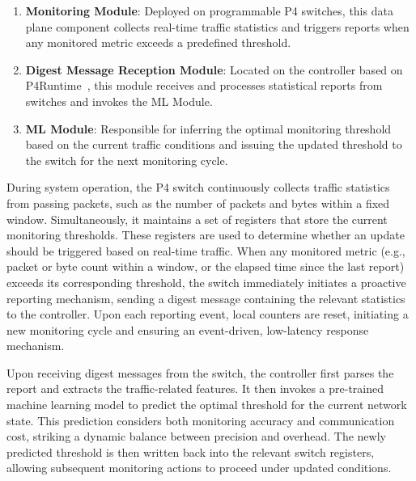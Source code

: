 \begin{enumerate}
    \item \textbf{Monitoring Module}: Deployed on programmable P4 switches, this data plane component collects real-time traffic statistics and triggers reports when any monitored metric exceeds a predefined threshold.
    \item \textbf{Digest Message Reception Module}: Located on the controller based on P4Runtime~\cite{P4Runtime}, this module receives and processes statistical reports from switches and invokes the ML Module.
    \item \textbf{ML Module}: Responsible for inferring the optimal monitoring threshold based on the current traffic conditions and issuing the updated threshold to the switch for the next monitoring cycle.
\end{enumerate}

During system operation, the P4 switch continuously collects traffic statistics from passing packets, such as the number of packets and bytes within a fixed window. 
Simultaneously, it maintains a set of registers that store the current monitoring thresholds. 
These registers are used to determine whether an update should be triggered based on real-time traffic. 
When any monitored metric (e.g., packet or byte count within a window, or the elapsed time since the last report) exceeds its corresponding threshold, the switch immediately initiates a proactive reporting mechanism, sending a digest message containing the relevant statistics to the controller. 
Upon each reporting event, local counters are reset, initiating a new monitoring cycle and ensuring an event-driven, low-latency response mechanism.

Upon receiving digest messages from the switch, the controller first parses the report and extracts the traffic-related features. 
It then invokes a pre-trained machine learning model to predict the optimal threshold for the current network state. 
This prediction considers both monitoring accuracy and communication cost, striking a dynamic balance between precision and overhead. 
The newly predicted threshold is then written back into the relevant switch registers, allowing subsequent monitoring actions to proceed under updated conditions.

